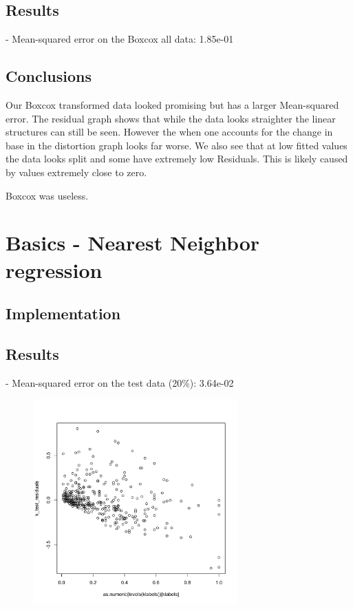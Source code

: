 \documentclass[12pt,a4paper]{article}
\begin{document}
\begin{singlespace}
\subsection{Results}
 - Mean-squared error on the Boxcox all data: 1.85e-01
\FloatBarrier

\subsection{Conclusions}
Our Boxcox transformed data looked promising but has a larger Mean-squared error.
The residual graph shows that while the data looks straighter the linear structures can still be seen.
However the when one accounts for the change in base in the distortion graph looks far worse. We also see that at low fitted values the data looks split and some have extremely low Residuals. This is likely caused by values extremely close to zero.

Boxcox was useless. 

\section{Basics - Nearest Neighbor regression}
\subsection{Implementation}


\subsection{Results}

- Mean-squared error on the test data (20\%): 3.64e-02


\vspace{-0.5cm}
\begin{figure}[h!]
    \centering
    \includegraphics[width=0.7\textwidth,trim= 0 0 20 30, clip]{NN_regression_residuals.pdf}
\end{figure}
\FloatBarrier



\end{singlespace}
\end{document}
